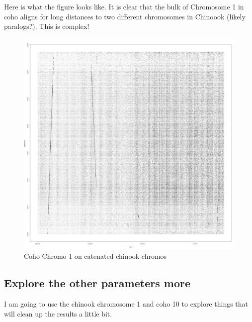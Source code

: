 \documentclass[]{krantz}
\makeatletter
\newenvironment{Shaded}{\begin{snugshade}}{\end{snugshade}}
\newcommand{\BuiltInTok}[1]{#1}
\newcommand{\CommentTok}[1]{\textcolor[rgb]{0.37,0.37,0.37}{\textit{#1}}}
\newcommand{\ExtensionTok}[1]{#1}
\newcommand{\KeywordTok}[1]{\textcolor[rgb]{0.27,0.27,0.27}{\textbf{#1}}}
\newcommand{\NormalTok}[1]{#1}
\newcommand{\OperatorTok}[1]{\textcolor[rgb]{0.43,0.43,0.43}{\textbf{#1}}}
\newcommand{\VariableTok}[1]{\textcolor[rgb]{0,0,0}{#1}}
\newenvironment{kframe}{%
\medskip{}
\setlength{\fboxsep}{.8em}
 \def\at@end@of@kframe{}%
 \ifinner\ifhmode%
  \def\at@end@of@kframe{\end{minipage}}%
  \begin{minipage}{\columnwidth}%
 \fi\fi%
 \def\FrameCommand##1{\hskip\@totalleftmargin \hskip-\fboxsep
 \colorbox{shadecolor}{##1}\hskip-\fboxsep
     \hskip-\linewidth \hskip-\@totalleftmargin \hskip\columnwidth}%
 \MakeFramed {\advance\hsize-\width
   \@totalleftmargin\z@ \linewidth\hsize
   \@setminipage}}%
 {\par\unskip\endMakeFramed%
 \at@end@of@kframe}
\renewenvironment{Shaded}{\begin{kframe}}{\end{kframe}}
\makeatother
\begin{document}
Here is what the figure looks like. It is clear that the bulk of Chromosome 1
in coho aligns for long distances to two different chromosomes in Chinoook (likely
paralogs?). This is complex!

\begin{figure}
\centering
\includegraphics{figs/quickie.jpg}
\caption{Coho Chromo 1 on catenated chinook chromos}
\end{figure}

\hypertarget{explore-the-other-parameters-more}{%
\subsection{Explore the other parameters more}\label{explore-the-other-parameters-more}}

I am going to use the chinook chromosome 1 and coho 10 to explore things that will
clean up the results a little bit.

\begin{Shaded}
\end{Shaded}
\end{document}
